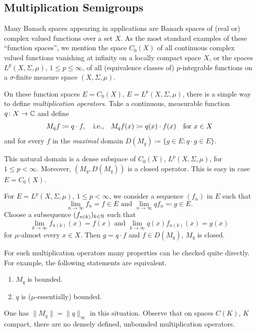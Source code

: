 \subsection{Multiplication Semigroups}\label{subsec:a1-2.3}%
Many Banach spaces appearing in applications are Banach spaces of (real or) complex valued functions over a set $X$.
As the most standard examples of these \enquote{function spaces}, we mention the space $C_{0}(X)$ of all continuous complex valued functions vanishing at infinity on a locally compact space $X$, or the spaces $L^{p}(X,\Sigma,\mu)$, $1 \leq p \leq \infty$, of all (equivalence classes of) $p$-integrable functions on a $\sigma$-finite measure space $(X,\Sigma,\mu)$.

On these function spaces $E = C_{0}(X)$, \resp $E = L^{p}(X,\Sigma,\mu)$, there is a simple way to define \emph{multiplication operators}.
Take a continuous, \resp measurable function $q \colon X \to \mathbb{C}$ and define
\[
    M_{q}f \coloneq q \cdot f, \quad \text{i.e.,} \quad M_{q}f(x) 
    \coloneq q(x) 	\cdot f(x) \quad \text{for } x \in X 
\]
and for every $f$ in the \emph{maximal} domain $D(M_{q}) \coloneq \{g \in E \colon q \cdot g \in E\}$.

This natural domain is a dense subspace of\/ $C_{0}(X)$, \resp $L^{p}(X,\Sigma,\mu)$, for $1 \leq p < \infty$.
Moreover, $(M_{q},D(M_{q}))$ is a closed operator.
This is easy in case $E = C_{0}(X)$.

For $E = L^{p}(X,\Sigma,\mu)$, $1 \leq p < \infty$, we consider a sequence $(f_{n})$ in  $E$ such that 
%
\[
	\lim_{n \to \infty} f_{n} = f \in E \text{ and } \lim_{n \to \infty} qf_{n} \eqqcolon g \in E .
\]
%
Choose a subsequence $(f_{n(k)})_{k \in \mathbb{N}}$ such that 
%
\[
	\lim_{k \to \infty} f_{n(k)}(x) = f(x) \text{ and } \lim_{k \to \infty} q(x)f_{n(k)}(x) = g(x)
\]
for $\mu$-almost every $x \in X$.
Then $g = q \cdot f$ and $f \in D(M_{q})$, \ie $M_{q}$ is closed.

For such multiplication operators many properties can be checked quite directly.
For example, the following statements are equivalent.
\begin{enumerate}[\upshape (a)]
\item 
$M_{q}$ is bounded.

\item 
$q$ is ($\mu$-essentially) bounded.
\end{enumerate}
One has $\|M_{q}\| = \|q\|_{\infty}$ in this situation.
Observe that on spaces $C(K)$, $K$ compact, there are no densely defined, unbounded multiplication operators.

